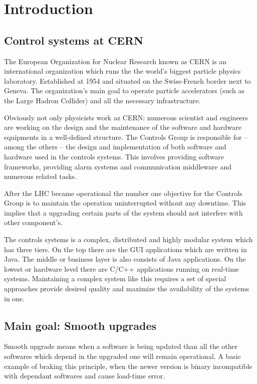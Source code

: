 \chapter{Introduction}


\section{Control systems at CERN}

The European Organization for Nuclear Research known as CERN is an international
organization which runs the the world's biggest particle physics laboratory.
Established at 1954 and situated on the Swiss-French border next to Geneva. The
organization's main goal to operate particle accelerators (such as the Large
Hadron Collider) and all the necessary infrastructure.

Obviously not only physicists work az CERN: numerous scientist and engineers are
working on the design and the maintenance of the software and hardware
equipments in a well-defined structure. The Controls Group is responsible for --
among the others -- the design and implementation of both software and hardware
used in the controls systems. This involves providing software frameworks,
providing alarm systems and communication middleware and numerous related tasks.

After the LHC became operational the number one objective for the Controls Group
is to maintain the operation uninterrupted without any downtime. This implies
that a upgrading certain parts of the system should not interfere with other
component's.

The controls systems is a complex, distributed and highly modular system which
has three tiers. On the top there are the GUI applications which are written in
Java. The middle or business layer is also consists of Java applications. On the
lowest or hardware level there are C/C++ applications running on real-time
systems. Maintaining a complex system like this requires a set of special
approaches provide desired quality and maximize the availability of the systems
in one.

\section{Main goal: Smooth upgrades}
Smooth upgrade means when a software is being updated than all the other
softwares which depend in the upgraded one will remain operational. A basic
example of braking this principle, when the newer version is binary
incompatible with dependant softwares and cause load-time error.

